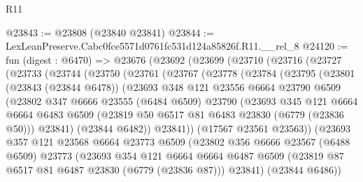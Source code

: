 \begin{lexlean}{R11}
\begin{coremodule}
@23843 := @23808 (@23840 @23841)
@23844 := LexLeanPreserve.Cabc0fce5571d0761fc531d124a85826f.R11.__rel_8
@24120 := fun (digest : @6470) =>
  @23676
    (@23692
      (@23699
        (@23710
          (@23716
            (@23727
              (@23733
                (@23744
                  (@23750
                    (@23761
                      (@23767
                        (@23778
                          (@23784
                            (@23795
                              (@23801
                                (@23843 (@23844 @6478))
                                (@23693
                                  @348
                                  @121
                                  @23556
                                  @6664
                                  @23790
                                  @6509
                                  (@23802
                                    @347
                                    @6666
                                    @23555
                                    (@6484 @6509)
                                    @23790
                                    (@23693
                                      @345
                                      @121
                                      @6664
                                      @6664
                                      @6483
                                      @6509
                                      (@23819 @50 @6517 @81 @6483 @23830 (@6779 (@23836 @50)))
                                      @23841)
                                    (@23844 @6482))
                                  @23841))
                              (@17567 @23561 @23563))
                            (@23693
                              @357
                              @121
                              @23568
                              @6664
                              @23773
                              @6509
                              (@23802
                                @356
                                @6666
                                @23567
                                (@6488 @6509)
                                @23773
                                (@23693
                                  @354
                                  @121
                                  @6664
                                  @6664
                                  @6487
                                  @6509
                                  (@23819 @87 @6517 @81 @6487 @23830 (@6779 (@23836 @87)))
                                  @23841)
                                (@23844 @6486))

\end{coremodule}
\end{lexlean}

